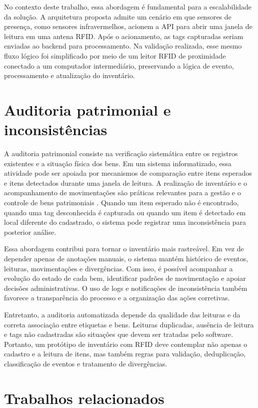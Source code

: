 No contexto deste trabalho, essa abordagem é fundamental para a escalabilidade da solução. A arquitetura proposta admite um cenário em que sensores de presença, como sensores infravermelhos, acionem a API para abrir uma janela de leitura em uma antena RFID. Após o acionamento, as tags capturadas seriam enviadas ao backend para processamento. Na validação realizada, esse mesmo fluxo lógico foi simplificado por meio de um leitor RFID de proximidade conectado a um computador intermediário, preservando a lógica de evento, processamento e atualização do inventário.

\section{Auditoria patrimonial e inconsistências}

A auditoria patrimonial consiste na verificação sistemática entre os registros existentes e a situação física dos bens. Em um sistema informatizado, essa atividade pode ser apoiada por mecanismos de comparação entre itens esperados e itens detectados durante uma janela de leitura. A realização de inventário e o acompanhamento de movimentações são práticas relevantes para a gestão e o controle de bens patrimoniais \cite{tceba2018}. Quando um item esperado não é encontrado, quando uma tag desconhecida é capturada ou quando um item é detectado em local diferente do cadastrado, o sistema pode registrar uma inconsistência para posterior análise.

Essa abordagem contribui para tornar o inventário mais rastreável. Em vez de depender apenas de anotações manuais, o sistema mantém histórico de eventos, leituras, movimentações e divergências. Com isso, é possível acompanhar a evolução do estado de cada bem, identificar padrões de movimentação e apoiar decisões administrativas. O uso de logs e notificações de inconsistência também favorece a transparência do processo e a organização das ações corretivas.

Entretanto, a auditoria automatizada depende da qualidade das leituras e da correta associação entre etiquetas e bens. Leituras duplicadas, ausência de leitura e tags não cadastradas são situações que devem ser tratadas pelo software. Portanto, um protótipo de inventário com RFID deve contemplar não apenas o cadastro e a leitura de itens, mas também regras para validação, deduplicação, classificação de eventos e tratamento de divergências.

\section{Trabalhos relacionados}


